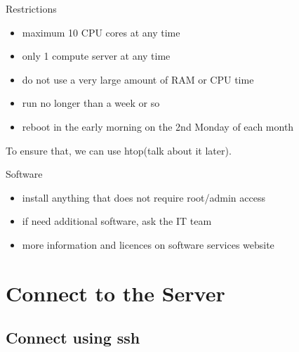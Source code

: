 \documentclass[10pt]{beamer}
\begin{document}
\begin{frame}[fragile]{Restrictions}

\begin{itemize}
    \item maximum 10 CPU cores at any time
    \item only 1 compute server at any time
    \item do not use a very large amount of RAM or CPU time
    \item run no longer than a week or so
    \item reboot in the early morning on the 2nd Monday of each month
\end{itemize}

To ensure that, we can use htop(talk about it later). 

\end{frame}

\begin{frame}[fragile]{Software}

\begin{itemize}
    \item install anything that does not require root/admin access
    \item if need additional software, ask the IT team
    \item more information and licences on software services website\footnotemark
\end{itemize}


\end{frame}

\section{Connect to the Server}

\subsection{Connect using ssh}
\end{document}
